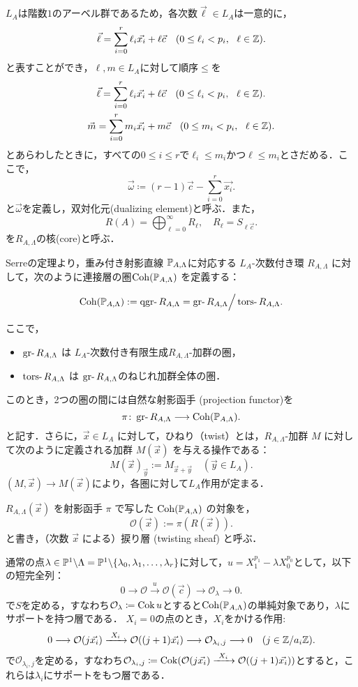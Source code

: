 $L_A$は階数$1$のアーベル群であるため，各次数$\vec{\ell}\in L_A$は一意的に，
\[\vec{\ell} = \sum_{i=0}^r \ell_i\vec{x_i} + \ell\vec{c}\quad (0\le \ell_i < p_i,\ \ \ell \in {\mathbb Z}).\]
と表すことができ，$\ell,m\in L_A$に対して順序$\le$を
\begin{gather*}
\vec{\ell} = \sum_{i=0}^r \ell_i\vec{x_i} + \ell\vec{c}\quad (0\le \ell_i < p_i,\ \ \ell \in \ZZ).\\
\vec{m} = \sum_{i=0}^r m_i\vec{x_i} + m\vec{c}\quad (0\le m_i < p_i,\ \ \ell \in \ZZ).
\end{gather*}
とあらわしたときに，すべての$0\le i\le r$で$\ell_i\le m_i$かつ$\ell\le m_i$とさだめる．ここで，
\[\vec{\omega} \coloneq (r-1)\vec{c} - \sum_{i=0}^r\vec{x_i}.\]
と$\vec{\omega}$を定義し，双対化元(dualizing element)と呼ぶ．また，
\[R(A)= \bigoplus_{\ell=0}^\infty R_{\ell},\quad R_\ell = S_{\ell\vec{c}}.\]
を$R_{A,\Lambda}$の核(core)と呼ぶ．

\begin{defn}\cite{GL87}
	Serreの定理より，重み付き射影直線 ${\mathbb P}_{A,\Lambda}$に対応する $L_A$-次数付き環 $R_{A,\Lambda}$ に対して，次のように連接層の圏$\operatorname{\mathrm{Coh}}({\mathbb P}_{A,\Lambda})$ を定義する：

\[
	\Coh(\PP_{A,\Lambda}) := \qgr R_{A,\Lambda} = \gr R_{A,\Lambda}\Big{/}\tors R_{A,\Lambda}.
\]

ここで，
\begin{itemize}
	\item $\gr R_{A,\Lambda}$ は $L_A$-次数付き有限生成$R_{A,\Lambda}$-加群の圏，
	\item $\tors R_{A,\Lambda}$ は $\gr R_{A,\Lambda}$のねじれ加群全体の圏．
\end{itemize}
このとき，2つの圏の間には自然な射影函手 (projection functor)を
\[ \pi\colon \gr R_{A,\Lambda} \longrightarrow \Coh(\PP_{A,\Lambda}) .\]
と記す．さらに，$\vec{x} \in L_A$ に対して，ひねり（twist）とは，$R_{A,\Lambda}$-加群 $M$ に対して次のように定義される加群 $M(\vec{x})$ を与える操作である：
\[
M(\vec{x})_{\vec{y}} := M_{\vec{x} + \vec{y}} \quad (\vec{y} \in L_A).
\]
$(M,\vec{x})\to M(\vec{x})$により，各圏に対して$L_A$作用が定まる．
\end{defn}
$R_{A,\Lambda}(\vec{x})$ を射影函手 $\pi$ で写した $\operatorname{\mathrm{Coh}}({\mathbb P}_{A,\Lambda})$ の対象を，
\[ \mathcal{O}(\vec{x}) := \pi(R(\vec{x})). \]
と書き，（次数 $\vec{x}$ による）捩り層 (twisting sheaf) と呼ぶ．

通常の点$\lambda\in{\mathbb P}^1\backslash\Lambda = {\mathbb P}^1\backslash\{\lambda_0,\lambda_1,\ldots, \lambda_r\}$に対して，$u = X_1^{p_1} - \lambda X_0^{p_0}$として，以下の短完全列：
\[0\longrightarrow \mathcal{O}\xrightarrow{\ u\ }\mathcal{O}(\vec{c})\longrightarrow \mathcal{O}_{\lambda}\longrightarrow 0.\]
で$S$を定める，すなわち$\mathcal{O}_{\lambda}\coloneq \operatorname{Cok} u $とすると$\operatorname{\mathrm{Coh}}({\mathbb P}_{A,\Lambda})$の単純対象であり，$\lambda$にサポートを持つ層である．
$X_i=0$の点のとき，$X_i$をかける作用:
\[0\longrightarrow \mathcal{O}(j\vec{x_i})\xrightarrow{\ X_i\ }\mathcal{O}((j+1)\vec{x_i})\longrightarrow \mathcal{O}_{\lambda_i,j}\longrightarrow 0\quad (j\in \ZZ/a_i\ZZ).\]
で$\mathcal{O}_{\lambda_i,j}$を定める，すなわち$\mathcal{O}_{\lambda_i,j}\coloneq \Cok (\mathcal{O}(j\vec{x_i})\xrightarrow{\ X_i\ }\mathcal{O}((j+1)\vec{x_i}))$とすると，これらは$\lambda_i$にサポートをもつ層である．

